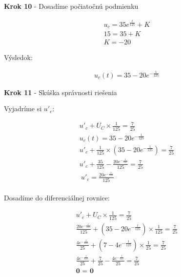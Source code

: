 \begin{center}
    \textbf{Krok 10} - Dosadíme počiatočnú podmienku
\end{center}

\begin{gather*}
   u_{c} = 35e^{\frac{t}{125}} + K \\
   15 = 35 + K \\
    K = - 20
\end{gather*}


Výsledok:

\begin{gather*}
	u_{c}(t) = 35-20e^{-\frac{1}{125}}
\end{gather*}

\begin{center}
    \textbf{Krok 11} - Skúška správnosti riešenia 
\end{center}

Vyjadríme si $u'_c$:

\begin{gather*}
    u'_{c} + U_{C} \times \frac {1} {125} = \frac {7} {25} \\
    u_{c}(t) = 35-20e^{-\frac{1}{125}} \\
    u'_{c} + \frac{1}{125} \times (35-20e^{-\frac{1}{125}}) = \frac {7} {25}\\
    u'_{c} + \frac {35}{125} - \frac {20e^{- \frac {t}{125}}} {125} = \frac {7} {25} \\\
    u'_{c} = \frac {20e^{- \frac {t}{125}}} {125} \\
\end{gather*}

Dosadíme do diferenciálnej rovnice:
 
\begin{gather*}
    u'_{c} + U_{C} \times \frac {1} {125} = \frac {7} {25} \\
    \frac {20e^{- \frac {t}{125}}} {125} + (35-20e^{-\frac{t}{125}}) \times \frac {1}{125} = \frac {7}{25} \\
    \frac {4e^{- \frac {t}{125}}} {25} + (7-4e^{-\frac{t}{125}}) \times \frac {1}{25} = \frac {7}{25} \\
    \frac {4e^{- \frac {t}{125}}} {25} + \frac {7}{25} - \frac {4e^{-\frac{t}{125}}} {25} = \frac {7}{25} \\
    \textbf{0 = 0} \\
\end{gather*}


